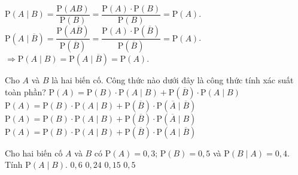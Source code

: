 \begin{ex}
{\begin{itemize}
	$\mathrm{P}\left(A \mid B\right)=
	\dfrac{\mathrm{P}\left(AB\right)}{\mathrm{P}\left(B\right) }=
	\dfrac{\mathrm{P}\left(A\right) \cdot \mathrm{P}\left(B\right) }{\mathrm{P}\left(B\right) }
	=\mathrm{P}\left(A\right)$.\\
	$\mathrm{P}\left(A \mid \overline{B}\right)=
	\dfrac{\mathrm{P}\left(A\overline{B}\right)}{\mathrm{P}\left(\overline{B}\right) }=
	\dfrac{\mathrm{P}\left(A\right) \cdot \mathrm{P}\left(\overline{B}\right) }{\mathrm{P}\left(\overline{B}\right) }
	=\mathrm{P}\left(A\right)$.\\
	$\Rightarrow \mathrm{P}\left(A\mid B\right)=
	\mathrm{P}\left(A \mid \overline{B}\right)=\mathrm{P}\left(A\right)$.
	\end{itemize}
	}
\end{ex}
\begin{ex}%
	Cho $A$ và $B$ là hai biến cố. Công thức nào dưới đây là công thức tính xác suất toàn phần?
	\choice
	{$\mathrm{P}\left(A\right)= \mathrm{P}\left(B\right)\cdot \mathrm{P}\left(A\mid B\right) + 
	\mathrm{P}\left(\overline{B}\right)\cdot \mathrm{P}\left(A\mid B\right)$}
	{$\mathrm{P}\left(A\right)= \mathrm{P}\left(B\right)\cdot \mathrm{P}\left(A\mid B\right) + 
	\mathrm{P}\left(\overline{B}\right)\cdot \mathrm{P}\left(\overline{A}\mid \overline{B}\right)$}
	{$\mathrm{P}\left(A\right)= \mathrm{P}\left(B\right)\cdot \mathrm{P}\left(A\mid B\right) + 
	\mathrm{P}\left(\overline{B}\right)\cdot \mathrm{P}\left(\overline{A}\mid B\right)$}
	{\True $\mathrm{P}\left(A\right)= \mathrm{P}\left(B\right)\cdot \mathrm{P}\left(A\mid B\right) + 
	\mathrm{P}\left(\overline{B}\right)\cdot \mathrm{P}\left(A\mid \overline{B}\right)$}
\end{ex}
\begin{ex}%
	Cho hai biến cố $A$ và $B$ có $\mathrm{P}\left(A\right) = 0{,}3$; $\mathrm{P}\left(B\right) = 0{,}5$ và
	$\mathrm{P}\left(B\mid A\right)=0{,}4$. Tính $\mathrm{P}\left(A\mid B\right)$. 
	\choice
	{$0{,}6$}
	{\True $0{,}24$}
	{$0{,}15$}
	{$0{,}5$}
\end{ex}
